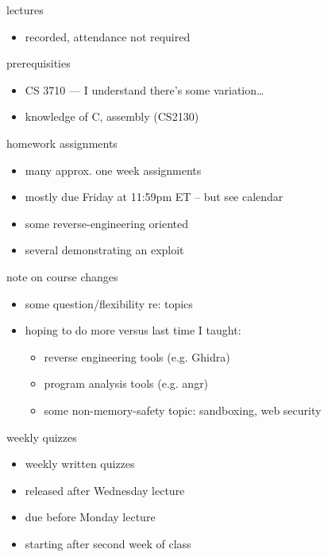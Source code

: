 \begin{frame}{lectures}
    \begin{itemize}
    \item recorded, attendance not required
    \end{itemize}
\end{frame}

\begin{frame}{prerequisities}
    \begin{itemize}
    \item CS 3710 --- I understand there's some variation\ldots
    \item knowledge of C, assembly (CS2130)
    \end{itemize}
\end{frame}

\begin{frame}{homework assignments}
\begin{itemize}
    \item many approx. one week assignments
    \item mostly due Friday at 11:59pm ET -- but see calendar
    \vspace{.5cm}
    \item some reverse-engineering oriented
    \item several demonstrating an exploit
\end{itemize}
\end{frame}

\begin{frame}{note on course changes}
    \begin{itemize}
    \item some question/flexibility re: topics
    \vspace{.5cm}
    \item hoping to do more versus last time I taught:
        \begin{itemize}
        \item reverse engineering tools (e.g. Ghidra)
        \item program analysis tools (e.g. angr)
        \item some non-memory-safety topic: sandboxing, web security
        \end{itemize}
    \end{itemize}
\end{frame}

\begin{frame}{weekly quizzes}
\begin{itemize}
    \item weekly written quizzes
    \item released after Wednesday lecture
    \item due before Monday lecture
    \item starting after second week of class
\end{itemize}
\end{frame}

